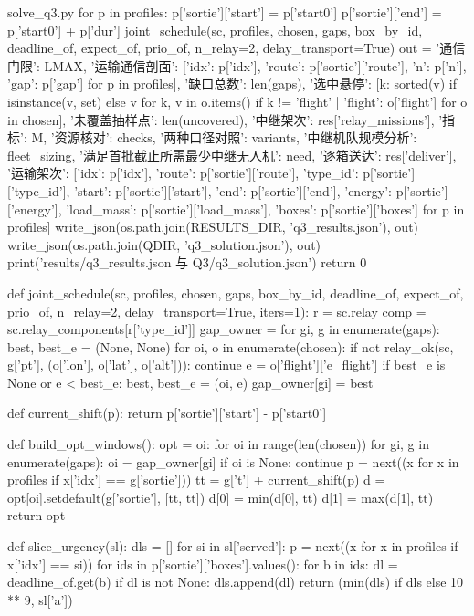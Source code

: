 \documentclass[bwprint]{gmcmthesis}
\begin{document}
\begin{appendices}
\begin{Python}{solve\_q3.py}
    for p in profiles:
        p['sortie']['start'] = p['start0']
        p['sortie']['end'] = p['start0'] + p['dur']
    joint_schedule(sc, profiles, chosen, gaps, box_by_id, deadline_of, expect_of, prio_of, n_relay=2, delay_transport=True)
    out = {'通信门限': LMAX, '运输通信剖面': [{'idx': p['idx'], 'route': p['sortie']['route'], 'n': p['n'], 'gap': p['gap']} for p in profiles], '缺口总数': len(gaps), '选中悬停': [{k: sorted(v) if isinstance(v, set) else v for k, v in o.items() if k != 'flight'} | {'flight': o['flight']} for o in chosen], '未覆盖抽样点': len(uncovered), '中继架次': res['relay_missions'], '指标': M, '资源核对': checks, '两种口径对照': variants, '中继机队规模分析': fleet_sizing, '满足首批截止所需最少中继无人机': need, '逐箱送达': res['deliver'], '运输架次': [{'idx': p['idx'], 'route': p['sortie']['route'], 'type_id': p['sortie']['type_id'], 'start': p['sortie']['start'], 'end': p['sortie']['end'], 'energy': p['sortie']['energy'], 'load_mass': p['sortie']['load_mass'], 'boxes': p['sortie']['boxes']} for p in profiles]}
    write_json(os.path.join(RESULTS_DIR, 'q3_results.json'), out)
    write_json(os.path.join(QDIR, 'q3_solution.json'), out)
    print(' results/q3_results.json 与 Q3/q3_solution.json')
    return 0

def joint_schedule(sc, profiles, chosen, gaps, box_by_id, deadline_of, expect_of, prio_of, n_relay=2, delay_transport=True, iters=1):
    r = sc.relay
    comp = sc.relay_components[r['type_id']]
    gap_owner = {}
    for gi, g in enumerate(gaps):
        best, best_e = (None, None)
        for oi, o in enumerate(chosen):
            if not relay_ok(sc, g['pt'], (o['lon'], o['lat'], o['alt'])):
                continue
            e = o['flight']['e_flight']
            if best_e is None or e < best_e:
                best, best_e = (oi, e)
        gap_owner[gi] = best

    def current_shift(p):
        return p['sortie']['start'] - p['start0']

    def build_opt_windows():
        opt = {oi: {} for oi in range(len(chosen))}
        for gi, g in enumerate(gaps):
            oi = gap_owner[gi]
            if oi is None:
                continue
            p = next((x for x in profiles if x['idx'] == g['sortie']))
            tt = g['t'] + current_shift(p)
            d = opt[oi].setdefault(g['sortie'], [tt, tt])
            d[0] = min(d[0], tt)
            d[1] = max(d[1], tt)
        return opt

    def slice_urgency(sl):
        dls = []
        for si in sl['served']:
            p = next((x for x in profiles if x['idx'] == si))
            for ids in p['sortie']['boxes'].values():
                for b in ids:
                    dl = deadline_of.get(b)
                    if dl is not None:
                        dls.append(dl)
        return (min(dls) if dls else 10 ** 9, sl['a'])


\end{Python}
\end{appendices}
\end{document}
